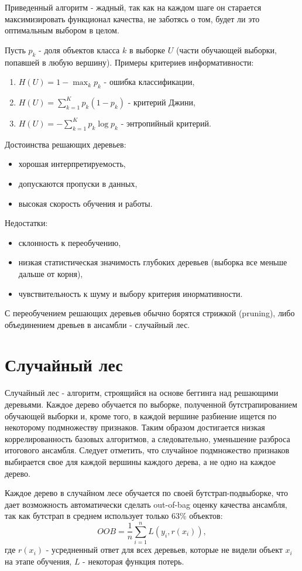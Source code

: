 Приведенный алгоритм - жадный, так как на каждом шаге он старается максимизировать функционал качества, не заботясь о том, будет ли это оптимальным выбором в целом.

Пусть $p_k$ - доля объектов класса $k$ в выборке $U$ (части обучающей выборки, попавшей в любую вершину). Примеры критериев информативности:
\begin{enumerate}
    \item $H(U) = 1 - \max_k p_k$ - ошибка классификации,
    \item $H(U) = \sum_{k=1}^Kp_k(1 - p_k)$ - критерий Джини,
    \item $H(U) = -\sum_{k=1}^Kp_k\log p_k$ - энтропийный критерий.
\end{enumerate}
Достоинства решающих деревьев:
\begin{itemize}
    \item хорошая интерпретируемость,
    \item допускаются пропуски в данных,
    \item высокая скорость обучения и работы.
\end{itemize}
Недостатки:
\begin{itemize}
    \item склонность к переобучению,
    \item низкая статистическая значимость глубоких деревьев (выборка все меньше дальше от корня),
    \item чувствительность к шуму и выбору критерия инормативности.
\end{itemize}
С переобучением решающих деревьев обычно борятся стрижкой (pruning), либо объединением древьев в ансамбли - случайный лес.


\section{Случайный лес}

Случайный лес - алгоритм, строящийся на основе беггинга над решающими деревьями. Каждое дерево обучается по выборке, полученной бутстрапированием обучающей выборки и, кроме того, в каждой вершине разбиение ищется по некоторому подмножеству признаков. Таким образом достигается низкая коррелированность базовых алгоритмов, а следовательно, уменьшение разброса итогового ансамбля. Следует отметить, что случайное подмножество признаков выбирается свое для каждой вершины каждого дерева, а не одно на каждое дерево.

Каждое дерево в случайном лесе обучается по своей бутстрап-подвыборке, что дает возможность автоматически сделать out-of-bag оценку качества ансамбля, так как бутстрап в среднем использует только 63\% объектов:
$$
OOB = \frac{1}{n}\sum_{i=1}^nL(y_i, r(x_i)),
$$
где $r(x_i)$ - усредненный ответ для всех деревьев, которые не видели объект $x_i$ на этапе обучения, $L$ - некоторая функция потерь.


